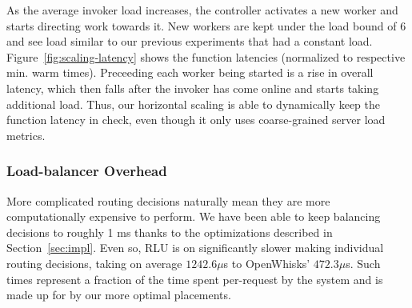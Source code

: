 As the average invoker load increases, the controller activates a new worker and starts directing work towards it.
New workers are kept under the load bound of 6 and see load similar to our previous experiments that had a constant load.
Figure~\ref{fig:scaling-latency} shows the function latencies (normalized to respective min. warm times). %
Preceeding each worker being started is a rise in overall latency, which then falls after the invoker has come online and starts taking additional load.
Thus, our horizontal scaling is able to dynamically keep the function latency in check, even though it only uses coarse-grained server load metrics.


\subsubsection{Load-balancer Overhead}


More complicated routing decisions naturally mean they are more computationally expensive to perform.
We have been able to keep balancing decisions to roughly 1 ms thanks to the optimizations described in Section~\ref{sec:impl}. 
Even so, RLU is on significantly slower making individual routing decisions, taking on average $1242.6 \mu$s to OpenWhisks' $472.3 \mu$s.
Such times represent a fraction of the time spent per-request by the system and is made up for by our more optimal placements. 
